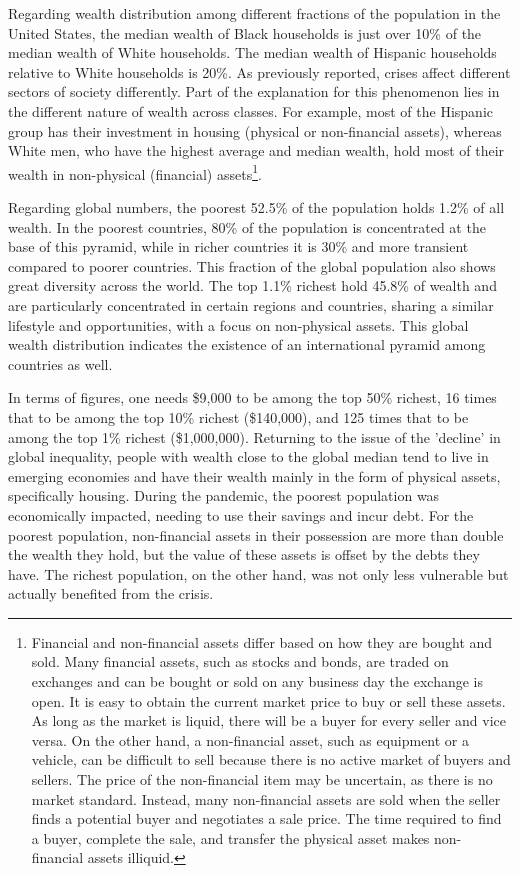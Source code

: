 Regarding wealth distribution among different fractions of the population in the United States, the median wealth of Black households is just over 10\% of the median wealth of White households. The median wealth of Hispanic households relative to White households is 20\%. As previously reported, crises affect different sectors of society differently. Part of the explanation for this phenomenon lies in the different nature of wealth across classes. For example, most of the Hispanic group has their investment in housing (physical or non-financial assets), whereas White men, who have the highest average and median wealth, hold most of their wealth in non-physical (financial) assets\footnote{Financial and non-financial assets differ based on how they are bought and sold. Many financial assets, such as stocks and bonds, are traded on exchanges and can be bought or sold on any business day the exchange is open. It is easy to obtain the current market price to buy or sell these assets. As long as the market is liquid, there will be a buyer for every seller and vice versa. On the other hand, a non-financial asset, such as equipment or a vehicle, can be difficult to sell because there is no active market of buyers and sellers. The price of the non-financial item may be uncertain, as there is no market standard. Instead, many non-financial assets are sold when the seller finds a potential buyer and negotiates a sale price. The time required to find a buyer, complete the sale, and transfer the physical asset makes non-financial assets illiquid.}. %

Regarding global numbers, the poorest 52.5\% of the population holds 1.2\% of all wealth. In the poorest countries, 80\% of the population is concentrated at the base of this pyramid, while in richer countries it is 30\% and more transient compared to poorer countries. This fraction of the global population also shows great diversity across the world. The top 1.1\% richest hold 45.8\% of wealth and are particularly concentrated in certain regions and countries, sharing a similar lifestyle and opportunities, with a focus on non-physical assets. This global wealth distribution indicates the existence of an international pyramid among countries as well.

In terms of figures, one needs \$9,000 to be among the top 50\% richest, 16 times that to be among the top 10\% richest (\$140,000), and 125 times that to be among the top 1\% richest (\$1,000,000). Returning to the issue of the 'decline' in global inequality, people with wealth close to the global median tend to live in emerging economies and have their wealth mainly in the form of physical assets, specifically housing. During the pandemic, the poorest population was economically impacted, needing to use their savings and incur debt. For the poorest population, non-financial assets in their possession are more than double the wealth they hold, but the value of these assets is offset by the debts they have. The richest population, on the other hand, was not only less vulnerable but actually benefited from the crisis.

